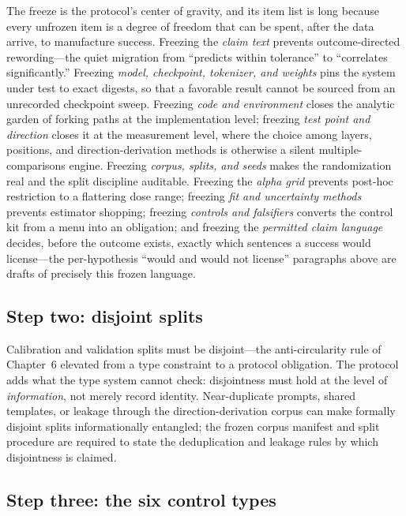 The freeze is the protocol's center of gravity, and its item list is long because every unfrozen item is a degree of freedom that can be spent, after the data arrive, to manufacture success. Freezing the \emph{claim text} prevents outcome-directed rewording---the quiet migration from ``predicts within tolerance'' to ``correlates significantly.'' Freezing \emph{model, checkpoint, tokenizer, and weights} pins the system under test to exact digests, so that a favorable result cannot be sourced from an unrecorded checkpoint sweep. Freezing \emph{code and environment} closes the analytic garden of forking paths at the implementation level; freezing \emph{test point and direction} closes it at the measurement level, where the choice among layers, positions, and direction-derivation methods is otherwise a silent multiple-comparisons engine. Freezing \emph{corpus, splits, and seeds} makes the randomization real and the split discipline auditable. Freezing the \emph{alpha grid} prevents post-hoc restriction to a flattering dose range; freezing \emph{fit and uncertainty methods} prevents estimator shopping; freezing \emph{controls and falsifiers} converts the control kit from a menu into an obligation; and freezing the \emph{permitted claim language} decides, before the outcome exists, exactly which sentences a success would license---the per-hypothesis ``would and would not license'' paragraphs above are drafts of precisely this frozen language.

\subsection{Step two: disjoint splits}\label{hyp:sec:step2}

Calibration and validation splits must be disjoint---the anti-circularity rule of Chapter~6 elevated from a type constraint to a protocol obligation. The protocol adds what the type system cannot check: disjointness must hold at the level of \emph{information}, not merely record identity. Near-duplicate prompts, shared templates, or leakage through the direction-derivation corpus can make formally disjoint splits informationally entangled; the frozen corpus manifest and split procedure are required to state the deduplication and leakage rules by which disjointness is claimed.

\subsection{Step three: the six control types}\label{hyp:sec:step3}


